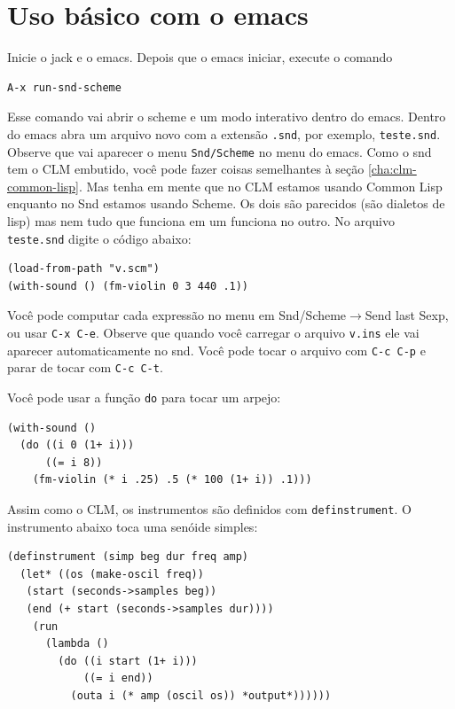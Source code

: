 \documentclass[12pt,brazil]{book}
\newcommand{\sep}{$\rightarrow$}
\begin{document}
\section{Uso básico com o emacs}
\label{sec:uso-basico-3}

Inicie o jack e o emacs. Depois que o emacs iniciar, execute o comando

\begin{verbatim}
A-x run-snd-scheme
\end{verbatim}

Esse comando vai abrir o scheme e um modo interativo dentro do emacs.
Dentro do emacs abra um arquivo novo com a extensão \texttt{.snd}, por
exemplo, \texttt{teste.snd}. Observe que vai aparecer o menu
\texttt{Snd/Scheme} no menu do emacs. Como o snd tem o CLM embutido,
você pode fazer coisas semelhantes à seção \ref{cha:clm-common-lisp}.
Mas tenha em mente que no CLM estamos usando Common Lisp enquanto no
Snd estamos usando Scheme. Os dois são parecidos (são dialetos de
lisp) mas nem tudo que funciona em um funciona no outro. No arquivo
\texttt{teste.snd} digite o código abaixo:

\begin{verbatim}
(load-from-path "v.scm")
(with-sound () (fm-violin 0 3 440 .1))
\end{verbatim}

Você pode computar cada expressão no menu em Snd/Scheme\sep Send last
Sexp, ou usar \texttt{C-x C-e}. Observe que quando você carregar o
arquivo \texttt{v.ins} ele vai aparecer automaticamente no snd. Você
pode tocar o arquivo com \texttt{C-c C-p} e parar de tocar com
\texttt{C-c C-t}.

Você pode usar a função \texttt{do} para tocar um arpejo:

\begin{verbatim}
(with-sound ()
  (do ((i 0 (1+ i)))
      ((= i 8))
    (fm-violin (* i .25) .5 (* 100 (1+ i)) .1)))
\end{verbatim}

Assim como o CLM, os instrumentos são definidos com
\texttt{definstrument}. O instrumento abaixo toca uma senóide simples:

\begin{verbatim}
(definstrument (simp beg dur freq amp)
  (let* ((os (make-oscil freq))
   (start (seconds->samples beg))
   (end (+ start (seconds->samples dur))))
    (run
      (lambda ()
        (do ((i start (1+ i))) 
            ((= i end))
          (outa i (* amp (oscil os)) *output*))))))
\end{verbatim}
\end{document}
